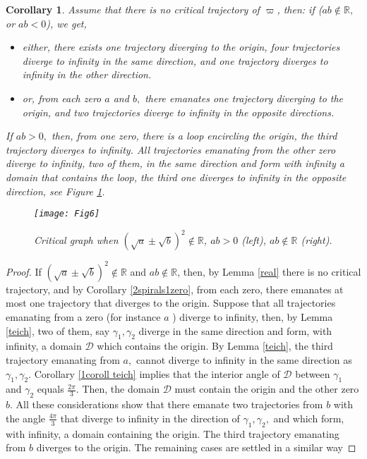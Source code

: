 \documentclass[12pt]{amsart}
\newtheorem{corollary}[theorem]{Corollary}
\begin{document}
\begin{corollary}
\label{1spiral2spirals} Assume that there is no critical trajectory of $\varpi $, then:\newline
if ($ab\notin 
\mathbb{R}
,$ or $ab<0$), we get,

\begin{itemize}
\item either, there exists one trajectory diverging to the origin, four
trajectories diverge to infinity in the same direction, and one trajectory
diverges to infinity in the other direction.

\item or, from each zero $a$ and $b,$ there emanates one trajectory
diverging to the origin, and two trajectories diverge to infinity in the
opposite directions.
\end{itemize}

\noindent If $ab>0,$ then, from one zero, there is a loop encircling the
origin, the third trajectory diverges to infinity. All trajectories
emanating from the other zero diverge to infinity, two of them, in the same
direction and form with infinity a domain that contains the loop, the third
one diverges to infinity in the opposite direction, see Figure \ref{Fig6}.
\begin{figure}[h]
\begin{center}
\texttt{[image: Fig6]}
\caption[le titre]{ Critical graph when $(\sqrt{a}\pm \sqrt{b})^2\notin\mathbb{R}$, $ab > 0$ (left), $ab \notin \mathbb{R}$ (right).}
\label{Fig6}
\end{center}
\end{figure}
\end{corollary}

\begin{proof}
If $\left( \sqrt{a}\pm \sqrt{b}\right) ^{2}\notin 
\mathbb{R}
$ and $ab\notin 
\mathbb{R}
$, then, by Lemma \ref{real} there is no critical trajectory, and by
Corollary \ref{2spirals1zero}, from each zero, there emanates at most one
trajectory that diverges to the origin. Suppose that all trajectories
emanating from a zero (for instance $a$ ) diverge to infinity, then, by
Lemma \ref{teich}, two of them, say $\gamma _{1},\gamma _{2}$ diverge in the
same direction and form, with infinity, a domain $\mathcal{D}$ which
contains the origin. By Lemma \ref{teich}, the third trajectory emanating
from $a,$ cannot diverge to infinity in the same direction as $\gamma
_{1},\gamma _{2}$. Corollary \ref{1coroll teich} implies that the interior
angle of $\mathcal{D}$ between $\gamma _{1}$ and $\gamma _{2}$ equals $\frac{2\pi }{3}.$ Then, the domain $\mathcal{D}$ must contain the origin and the
other zero $b.$\newline
All these considerations show that there emanate two trajectories from $b$
with the angle $\frac{4\pi }{3}$ that diverge to infinity in the direction
of $\gamma _{1},\gamma _{2},$ and which form, with infinity, a domain
containing the origin. The third trajectory emanating from $b$ diverges to
the origin.\newline
The remaining cases are settled in a similar way
\end{proof}
\end{document}
